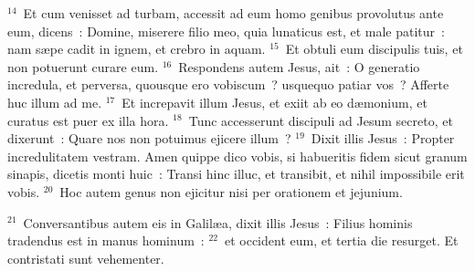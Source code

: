 ${}^{14}$~Et cum venisset ad turbam, accessit ad eum homo genibus provolutus ante eum, dicens~: Domine, miserere filio meo, quia lunaticus est, et male patitur~: nam s\ae pe cadit in ignem, et crebro in aquam.
${}^{15}$~Et obtuli eum discipulis tuis, et non potuerunt curare eum.
${}^{16}$~Respondens autem Jesus, ait~: O generatio incredula, et perversa, quousque ero vobiscum~? usquequo patiar vos~? Afferte huc illum ad me.
${}^{17}$~Et increpavit illum Jesus, et exiit ab eo d\ae monium, et curatus est puer ex illa hora.
${}^{18}$~Tunc accesserunt discipuli ad Jesum secreto, et dixerunt~: Quare nos non potuimus ejicere illum~?
${}^{19}$~Dixit illis Jesus~: Propter incredulitatem vestram. Amen quippe dico vobis, si habueritis fidem sicut granum sinapis, dicetis monti huic~: Transi hinc illuc, et transibit, et nihil impossibile erit vobis.
${}^{20}$~Hoc autem genus non ejicitur nisi per orationem et jejunium.


${}^{21}$~Conversantibus autem eis in Galil\ae a, dixit illis Jesus~: Filius hominis tradendus est in manus hominum~:
${}^{22}$~et occident eum, et tertia die resurget. Et contristati sunt vehementer.


